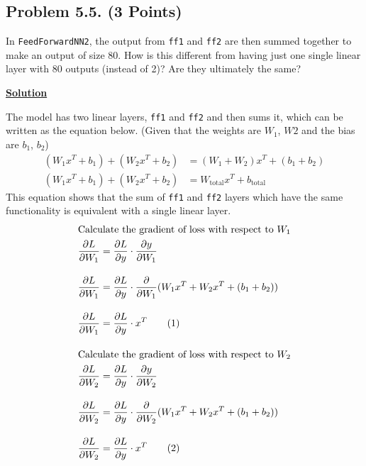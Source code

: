 \documentclass[12pt, a4paper]{article}
\begin{document}
    \pagebreak
        \subsection{Problem 5.5. (3 Points)}
            In \texttt{FeedForwardNN2}, the output from \texttt{ff1} and \texttt{ff2} are then summed together to make an output of size 80.
            How is this different from having just one single linear layer with 80 outputs (instead of 2)?
            Are they ultimately the same?

            \vspace{1em}

            \noindent \underline{\textbf{Solution}}

            \vspace{0.25em}

            The model has two linear layers, \texttt{ff1} and \texttt{ff2} and then sums it, which can be written as the equation below.
            (Given that the weights are $W_1$, $W2$ and the bias are $b_1$, $b_2$)
            \begin{align*}
                (W_1 x^T + b_1) + (W_2 x^T + b_2) &= (W_1 + W_2)x^T + (b_1 + b_2) \\
                (W_1 x^T + b_1) + (W_2 x^T + b_2) &= W_{\text{total}} x^T + b_{\text{total}}
            \end{align*}
            This equation shows that the sum of \texttt{ff1} and \texttt{ff2} layers which have the same functionality
            is equivalent with a single linear layer.
            \begin{align*}
                \intertext{Calculate the gradient of loss with respect to $W_1$}
                \frac{\partial L}{\partial W_1} &= \frac{\partial L}{\partial y} \cdot \frac{\partial y}{\partial W_1} \\[1em]
                \frac{\partial L}{\partial W_1} &= \frac{\partial L}{\partial y} \cdot \frac{\partial}{\partial W_1} (W_1 x^T + W_2 x^T + (b_1 + b_2)) \\[1em]
                \frac{\partial L}{\partial W_1} &= \frac{\partial L}{\partial y} \cdot x^T \tag{1} \\[1em]
                \intertext{Calculate the gradient of loss with respect to $W_2$}
                \frac{\partial L}{\partial W_2} &= \frac{\partial L}{\partial y} \cdot \frac{\partial y}{\partial W_2} \\[1em]
                \frac{\partial L}{\partial W_2} &= \frac{\partial L}{\partial y} \cdot \frac{\partial}{\partial W_2} (W_1 x^T + W_2 x^T + (b_1 + b_2)) \\[1em]
                \frac{\partial L}{\partial W_2} &= \frac{\partial L}{\partial y} \cdot x^T \tag{2}
            \end{align*}
\end{document}
